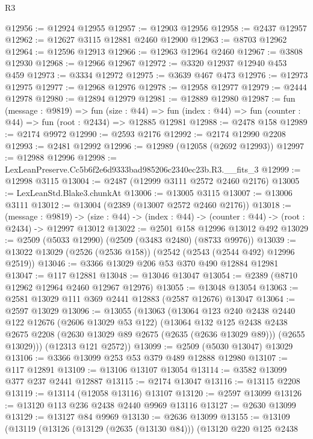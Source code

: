 \begin{lexlean}{R3}
\begin{coremodule}
@12956 := @12924 @12955
@12957 := @12903 @12956
@12958 := @2437 @12957
@12962 := @12627 @3115 @12881 @2460 @12900
@12963 := @8703 @12962
@12964 := @12596 @12913
@12966 := @12963 @12964 @2460
@12967 := @3808 @12930
@12968 := @12966 @12967
@12972 := @3320 @12937 @12940 @453 @459
@12973 := @3334 @12972
@12975 := @3639 @467 @473
@12976 := @12973 @12975
@12977 := @12968 @12976
@12978 := @12958 @12977
@12979 := @2444 @12978
@12980 := @12894 @12979
@12981 := @12889 @12980
@12987 := fun (message : @9819) =>
  fun (size : @44) =>
  fun (index : @44) => fun (counter : @44) => fun (root : @2434) => @12885 @12981
@12988 := @2478 @158
@12989 := @2174 @9972
@12990 := @2593 @2176
@12992 := @2174 @12990 @2208
@12993 := @2481 @12992
@12996 := @12989 (@12058 (@2692 @12993))
@12997 := @12988 @12996
@12998 := LexLeanPreserve.Cc5b6f2e6d9333bad985206c2340ec23b.R3.__fits_3
@12999 := @12998 @3115
@13004 := @2487 (@12999 @3111 @2572 @2460 @2176)
@13005 := LexLeanStd.Blake3.chunkAt
@13006 := @13005 @3115
@13007 := @13006 @3111
@13012 := @13004 (@2389 (@13007 @2572 @2460 @2176))
@13018 := (message : @9819) ->
  (size : @44) -> (index : @44) -> (counter : @44) -> (root : @2434) -> @12997 @13012
@13022 := @2501 @158 @12996 @13012 @492
@13029 := @2509 (@5033 @12990) (@2509 (@3483 @2480) (@8733 @9976))
@13039 := @13022 @13029 (@2526 (@2536 @158)) (@2542 (@2543 (@2544 @492) @12996 @2519))
@13046 := @3366 @13029 @206 @53 @370 @490 @12884 @12981
@13047 := @117 @12881
@13048 := @13046 @13047
@13054 := @2389 (@8710 @12962 @12964 @2460 @12967 @12976)
@13055 := @13048 @13054
@13063 := @2581 @13029 @111 @369 @2441 @12883 (@2587 @12676) @13047
@13064 := @2597 @13029
@13096 := @13055
    (@13063
      (@13064
        @123
        @240
        @2438
        @2440
        @122
        @12676
        (@2606 @13029 @53 @122)
        (@13064
          @132
          @125
          @2438
          @2438
          @2675
          @2208
          (@2630 @13029 @89 @2675 (@2635 (@2636 @13029 @89)))
          (@2655 @13029)))
      (@12313 @121 @2572))
@13099 := @2509 (@5030 @13047) @13029
@13106 := @3366 @13099 @253 @53 @379 @489 @12888 @12980
@13107 := @117 @12891
@13109 := @13106 @13107 @13054
@13114 := @3582 @13099 @377 @237 @2441 @12887
@13115 := @2174 @13047
@13116 := @13115 @2208
@13119 := @13114 (@12058 @13116) @13107
@13120 := @2597 @13099
@13126 := @13120 @113 @236 @2438 @2440 @9969 @13116
@13127 := @2630 @13099
@13129 := @13127 @84 @9969
@13130 := @2636 @13099
@13155 := @13109
    (@13119
      (@13126
        (@13129 (@2635 (@13130 @84)))
        (@13120
          @220
          @125
          @2438

\end{coremodule}
\end{lexlean}
